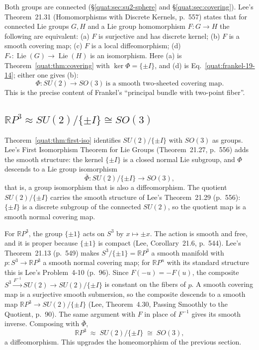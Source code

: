 Both groups are connected (\S\ref{quat:sec:su2-sphere} and
\S\ref{quat:sec:covering}). Lee's Theorem~21.31 (Homomorphisms with Discrete
Kernels, p.~557) states that for connected Lie groups $G,H$ and a Lie group
homomorphism $F\colon G\to H$ the following are equivalent: (a) $F$ is
surjective and has discrete kernel; (b) $F$ is a smooth covering map; (c) $F$
is a local diffeomorphism; (d) $F_*\colon\operatorname{Lie}(G)\to
\operatorname{Lie}(H)$ is an isomorphism. Here (a) is
Theorem~\ref{quat:thm:covering} with $\ker\Phi=\{\pm I\}$, and (d) is
Eq.~\eqref{quat:frankel-19-14}; either one gives (b):
\begin{equation}\label{quat:Phi-smooth-cover}
 \Phi\colon SU(2)\to SO(3)\ \text{is a smooth two-sheeted covering map.}
\end{equation}
This is the precise content of Frankel's ``principal bundle with two-point
fiber''.

\subsection{\texorpdfstring{$\mathbb RP^3\approx SU(2)/\{\pm I\}\cong SO(3)$}{RP3 = SU(2)/{+-I} = SO(3)}}
Theorem~\ref{quat:thm:first-iso} identifies $SU(2)/\{\pm I\}$ with $SO(3)$ as
groups. Lee's First Isomorphism Theorem for Lie Groups (Theorem~21.27,
p.~556) adds the smooth structure: the kernel $\{\pm I\}$ is a closed normal
Lie subgroup, and $\Phi$ descends to a Lie group isomorphism
\begin{equation}
 \bar\Phi\colon SU(2)/\{\pm I\}\to SO(3),
\end{equation}
that is, a group isomorphism that is also a diffeomorphism. The quotient
$SU(2)/\{\pm I\}$ carries the smooth structure of Lee's Theorem~21.29
(p.~556): $\{\pm I\}$ is a discrete subgroup of the connected $SU(2)$, so the
quotient map is a smooth normal covering map.

For $\mathbb RP^3$, the group $\{\pm1\}$ acts on $S^3$ by $x\mapsto\pm x$. The
action is smooth and free, and it is proper because $\{\pm1\}$ is compact
(Lee, Corollary~21.6, p.~544). Lee's Theorem~21.13 (p.~549) makes
$S^3/\{\pm1\}=\mathbb RP^3$ a smooth manifold with $p\colon S^3\to\mathbb RP^3$
a smooth normal covering map; for $\mathbb RP^n$ with its standard structure
this is Lee's Problem~4-10 (p.~96). Since $F(-u)=-F(u)$, the composite
$S^3\xrightarrow{F^{-1}}SU(2)\to SU(2)/\{\pm I\}$ is constant on the fibers
of $p$. A smooth covering map is a surjective smooth submersion, so the
composite descends to a smooth map $\mathbb RP^3\to SU(2)/\{\pm I\}$ (Lee,
Theorem~4.30, Passing Smoothly to the Quotient, p.~90). The same argument
with $F$ in place of $F^{-1}$ gives its smooth inverse. Composing with
$\bar\Phi$,
\begin{equation}\label{quat:SO3-RP3-smooth}
 \mathbb RP^3\;\approx\;SU(2)/\{\pm I\}\;\cong\;SO(3),
\end{equation}
a diffeomorphism. This upgrades the homeomorphism of the previous section.

